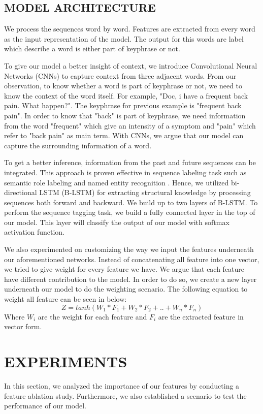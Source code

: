 \subsection{MODEL ARCHITECTURE}
We process the sequences word by word. Features are extracted from every word as the input representation of the model. The output for this words are label which describe a word is either part of keyphrase or not.

To give our model a better insight of context, we introduce Convolutional Neural Networks (CNNs) to capture context from three adjacent words.  From our observation, to know whether a word is part of keyphrase or not, we need to know the context of the word itself. For example, "Doc, i have a frequent back pain. What happen?". The keyphrase for previous example is "frequent back pain". In order to know that "back" is part of keyphrase, we need information from the word "frequent" which give an intensity of a symptom and "pain" which refer to "back pain" as main term. With CNNs, we argue that our model can capture the surrounding information of a word.

To get a better inference, information from the past and future sequences can be integrated. This approach is proven effective  in sequence labeling task such as semantic role labeling \cite{SMRzhou2015end} and named entity recognition \cite{ma2016end}. Hence, we utilized  bi-directional LSTM (B-LSTM) for extracting structural knowledge by processing sequences both forward and backward. We build up to two layers of B-LSTM.
To perform the sequence tagging task, we build a fully connected layer in the top of our model. This layer will classify the output of our model with softmax activation function.

We also experimented on customizing the way we input the features underneath our aforementioned networks. Instead of concatenating all feature into one vector, we tried to give weight for every feature we have. We argue that each feature have different contribution to the model. In order to do so, we create a new layer underneath our model to do the weighting scenario. The following equation to weight all feature can be seen in below:
\begin{equation}
Z =  tanh(W _{1}*F_{1} + W_{2}*F_{2} + .. + W_{n}*F_{n})
\end{equation}
Where $W_{i}$ are the weight for each feature and $F_{i}$ are the extracted feature in vector form.
\section{EXPERIMENTS}
In this section, we analyzed the importance of our features by conducting a feature ablation study. Furthermore, we also established a scenario to test the performance of our model.
